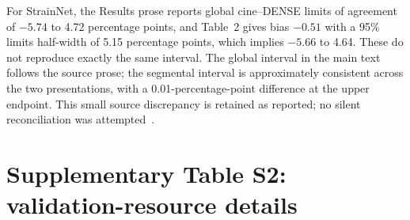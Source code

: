 \documentclass[11pt,a4paper]{article}
\begin{document}
For StrainNet, the Results prose reports global cine--DENSE limits of agreement of \(-5.74\) to 4.72 percentage points, and Table~2 gives bias \(-0.51\) with a 95\% limits half-width of 5.15 percentage points, which implies \(-5.66\) to 4.64. These do not reproduce exactly the same interval. The global interval in the main text follows the source prose; the segmental interval is approximately consistent across the two presentations, with a 0.01-percentage-point difference at the upper endpoint. This small source discrepancy is retained as reported; no silent reconciliation was attempted~\cite{wang2023strainnet}.

\section*{Supplementary Table S2: validation-resource details}
\end{document}
